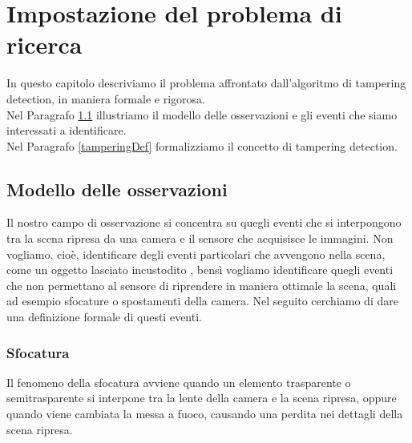 \chapter{Impostazione del problema di ricerca}
\label{FormulazioneProblema}
\thispagestyle{empty}

In questo capitolo descriviamo il problema affrontato dall'algoritmo di tampering detection, in maniera formale e rigorosa. \\
Nel Paragrafo \ref{modelloOsservaz} illustriamo il modello delle osservazioni e gli eventi che siamo interessati a identificare.\\
Nel Paragrafo \ref{tamperingDef} formalizziamo il concetto di tampering detection. 
\noindent 
\section{Modello delle osservazioni}
\label{modelloOsservaz}
Il nostro campo di osservazione si concentra su quegli eventi che si interpongono tra la scena ripresa da una camera e il sensore che acquisisce le immagini. Non vogliamo, cio\`e, identificare degli eventi particolari che avvengono nella scena, come un oggetto lasciato incustodito \cite{Targhe}, bens\`i vogliamo identificare quegli eventi che non permettano al sensore di riprendere in maniera ottimale la scena, quali ad esempio sfocature o spostamenti della camera.
Nel seguito cerchiamo di dare una definizione formale di questi eventi.
\subsection{Sfocatura}
\label{sfocatura}
Il fenomeno della sfocatura avviene quando un elemento trasparente o semitrasparente si interpone tra la lente della camera e la \gls{scena} ripresa, oppure quando viene cambiata la messa a fuoco, causando una perdita nei dettagli della \gls{scena} ripresa.

